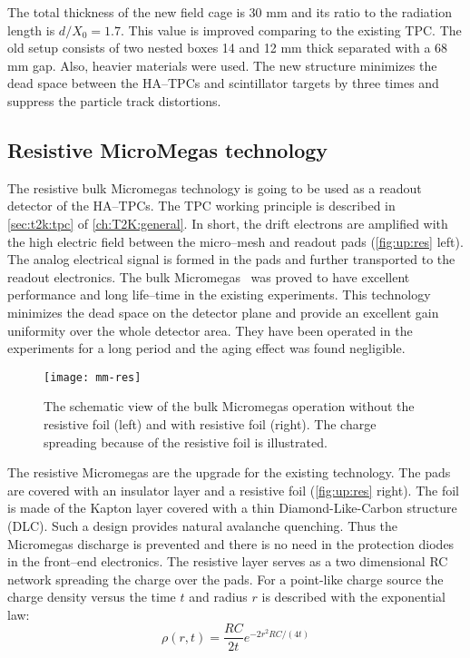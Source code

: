 \documentclass[../main.tex]{subfiles}
\begin{document}
The total thickness of the new field cage is 30 mm and its ratio to the radiation length is $d/X_0=1.7$. This value is improved comparing to the existing TPC. The old setup consists of two nested boxes 14 and 12 mm thick separated with a 68 mm gap. Also, heavier materials were used. The new structure minimizes the dead space between the HA--TPCs and scintillator targets by three times and suppress the particle track distortions.

\subsection{Resistive MicroMegas technology}
\label{sec:up:res}
The resistive bulk Micromegas technology is going to be used as a readout detector of the HA--TPCs. The TPC working principle is described in \autoref{sec:t2k:tpc} of \autoref{ch:T2K:general}. In short, the drift electrons are amplified with the high electric field between the micro--mesh and readout pads (\autoref{fig:up:res} left). The analog electrical signal is formed in the pads and further transported to the readout electronics. The bulk Micromegas~\cite{Giomataris2005} was proved to have excellent performance and long life--time in the existing experiments. This technology minimizes the dead space on the detector plane and provide an excellent gain uniformity over the whole detector area. They have been operated in the experiments for a long period and the aging effect was found negligible.

\begin{figure}[!ht]
  \centering
  \texttt{[image: mm-res]}
  \caption{The schematic view of the bulk Micromegas operation without the resistive foil (left) and with resistive foil (right). The charge spreading because of the resistive foil is illustrated.}
  \label{fig:up:res}
\end{figure}

The resistive Micromegas are the upgrade for the existing technology. The pads are covered with an insulator layer and a resistive foil (\autoref{fig:up:res} right). The foil is made of the Kapton layer covered with a thin Diamond-Like-Carbon structure (DLC). Such a design provides natural avalanche quenching. Thus the Micromegas discharge is prevented and there is no need in the protection diodes in the front--end electronics. The resistive layer serves as a two dimensional RC network spreading the charge over the pads. For a point-like charge source the charge density versus the time $t$ and radius $r$ is described with the exponential law:
\begin{equation}
\rho(r,t)=\frac{RC}{2t}e^{-2r^2RC/\left(4t\right)}
\end{equation}
\end{document}
